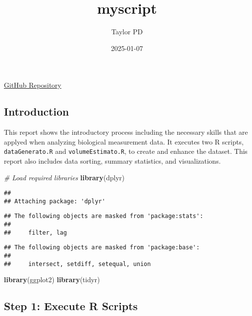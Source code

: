 \documentclass[
]{article}
\title{myscript}
\author{Taylor PD}
\date{2025-01-07}
\newenvironment{Shaded}{\begin{snugshade}}{\end{snugshade}}
\newcommand{\CommentTok}[1]{\textcolor[rgb]{0.56,0.35,0.01}{\textit{#1}}}
\newcommand{\FunctionTok}[1]{\textcolor[rgb]{0.13,0.29,0.53}{\textbf{#1}}}
\newcommand{\NormalTok}[1]{#1}
\begin{document}
\maketitle

\href{https://github.com/Taylorpd4/BIOL432_Assignment1TP}{GitHub
Repository}

\subsection{Introduction}\label{introduction}

This report shows the introductory process including the necessary
skills that are applyed when analyzing biological measurement data. It
executes two R scripts, \texttt{dataGenerato.R} and
\texttt{volumeEstimato.R}, to create and enhance the dataset. This
report also includes data sorting, summary statistics, and
visualizations.

\begin{Shaded}
\begin{Highlighting}[]
\CommentTok{\# Load required libraries}
\FunctionTok{library}\NormalTok{(dplyr)}
\end{Highlighting}
\end{Shaded}

\begin{verbatim}
## 
## Attaching package: 'dplyr'
\end{verbatim}

\begin{verbatim}
## The following objects are masked from 'package:stats':
## 
##     filter, lag
\end{verbatim}

\begin{verbatim}
## The following objects are masked from 'package:base':
## 
##     intersect, setdiff, setequal, union
\end{verbatim}

\begin{Shaded}
\begin{Highlighting}[]
\FunctionTok{library}\NormalTok{(ggplot2)}
\FunctionTok{library}\NormalTok{(tidyr)}
\end{Highlighting}
\end{Shaded}

\subsection{Step 1: Execute R Scripts}\label{step-1-execute-r-scripts}
\end{document}
